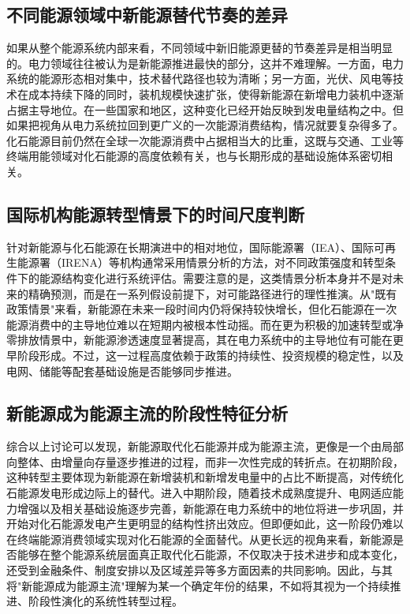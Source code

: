 \documentclass[twocolumn, a4paper, 10pt, UTF8]{ctexart}
\begin{document}
\subsection{不同能源领域中新能源替代节奏的差异}
如果从整个能源系统内部来看，不同领域中新旧能源更替的节奏差异是相当明显的。电力领域往往被认为是新能源推进最快的部分，这并不难理解。一方面，电力系统的能源形态相对集中，技术替代路径也较为清晰；另一方面，光伏、风电等技术在成本持续下降的同时，装机规模快速扩张，使得新能源在新增电力装机中逐渐占据主导地位。在一些国家和地区，这种变化已经开始反映到发电量结构之中。但如果把视角从电力系统拉回到更广义的一次能源消费结构，情况就要复杂得多了。化石能源目前仍然在全球一次能源消费中占据相当大的比重，这既与交通、工业等终端用能领域对化石能源的高度依赖有关，也与长期形成的基础设施体系密切相关。

\subsection{国际机构能源转型情景下的时间尺度判断}
针对新能源与化石能源在长期演进中的相对地位，国际能源署（IEA）、国际可再生能源署（IRENA）等机构通常采用情景分析的方法，对不同政策强度和转型条件下的能源结构变化进行系统评估。需要注意的是，这类情景分析本身并不是对未来的精确预测，而是在一系列假设前提下，对可能路径进行的理性推演。从"既有政策情景"来看，新能源在未来一段时间内仍将保持较快增长，但化石能源在一次能源消费中的主导地位难以在短期内被根本性动摇。而在更为积极的加速转型或净零排放情景中，新能源渗透速度显著提高，其在电力系统中的主导地位有可能在更早阶段形成。不过，这一过程高度依赖于政策的持续性、投资规模的稳定性，以及电网、储能等配套基础设施是否能够同步推进。

\subsection{新能源成为能源主流的阶段性特征分析}
综合以上讨论可以发现，新能源取代化石能源并成为能源主流，更像是一个由局部向整体、由增量向存量逐步推进的过程，而非一次性完成的转折点。在初期阶段，这种转型主要体现为新能源在新增装机和新增发电量中的占比不断提高，对传统化石能源发电形成边际上的替代。进入中期阶段，随着技术成熟度提升、电网适应能力增强以及相关基础设施逐步完善，新能源在电力系统中的地位将进一步巩固，并开始对化石能源发电产生更明显的结构性挤出效应。但即便如此，这一阶段仍难以在终端能源消费领域实现对化石能源的全面替代。从更长远的视角来看，新能源是否能够在整个能源系统层面真正取代化石能源，不仅取决于技术进步和成本变化，还受到金融条件、制度安排以及区域差异等多方面因素的共同影响。因此，与其将"新能源成为能源主流"理解为某一个确定年份的结果，不如将其视为一个持续推进、阶段性演化的系统性转型过程。
\end{document}

